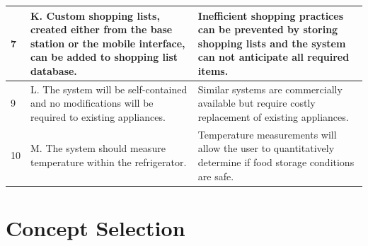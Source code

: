 \documentclass[11pt]{article} %
\begin{document}
\begin{table}[h!]
\begin{center}
\begin{tabular}{| p{1.2in} | p{2.5in} |p{2.5in} |}
\hline
7&K. Custom shopping lists, created either from the base station or the mobile interface, can be added to shopping list database.&Inefficient shopping practices can be prevented by storing shopping lists and the system can not anticipate all required items.\\
\hline
9&L. The system will be self-contained and no modifications will be required to existing appliances.&Similar systems are commercially available but require costly replacement of existing appliances.\\
\hline
10&M. The system should measure temperature within the refrigerator. & Temperature measurements will allow the user to quantitatively determine if food storage conditions are safe. \\
\hline
\end{tabular}
\end{center}
\end{table}
\pagebreak
\section{Concept Selection}
\end{document}
